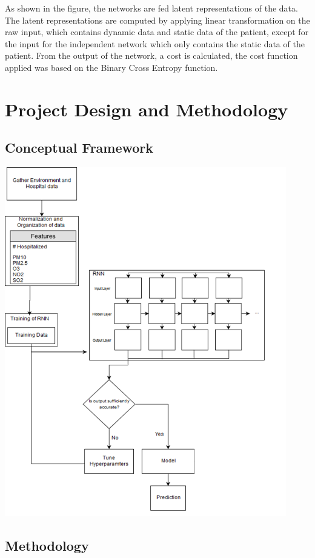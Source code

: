 \documentclass[10pt,11pt,12pt,oneside]{book}
\begin{document}
    As shown in the figure, the networks are fed latent representations of the data. The latent representations are computed by applying linear transformation on the raw input, which contains dynamic data and static data of the patient, except for the input for the independent network which only contains the static data of the patient. From the output of the network, a cost is calculated, the cost function applied was based on the Binary Cross Entropy function. \cite{DBLP:journals/corr/EstebanSYT16}
    \FloatBarrier
\chapter{Project Design and Methodology}
\section{Conceptual Framework}
\includegraphics[height=6in]{conframework.png}
\section{Methodology}
\end{document}
